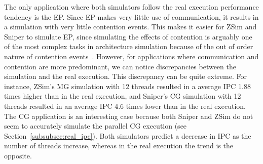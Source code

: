 \documentclass[AMA,final,STIX1COL]{WileyNJD-v2}
\newcommand{\fbm}[1]{\textcolor{red}{\bfseries \ul{fbm: #1} }\vspace{0.2cm}}
\begin{document}
The only application where both simulators follow the real execution performance tendency is the EP. Since EP makes very little use of communication, it results in a simulation with very little contention events. 
This makes it easier for ZSim and Sniper to simulate EP, since simulating the effects of contention is arguably one of the most complex tasks in architecture simulation because of the out of order nature of contention events~\cite{sanchez2013zsim}.
However, for applications where communication and contention are more predominant, we can notice discrepancies between the simulation and the real execution. 
This discrepancy can be quite extreme. For instance, ZSim's MG simulation with 12 threads resulted in a average IPC 1.88 times higher than in the real execution, and Sniper's CG simulation with 12 threads resulted in an average IPC 4.6 times lower than in the real execution. 
The CG application is an interesting case because both Sniper and ZSim do not seem to accurately simulate the parallel CG execution (see Section~\ref{subsubsec:real_ipc}).
Both simulators predict a decrease in IPC as the number of threads increase, whereas in the real execution the trend is the opposite.
\end{document}
